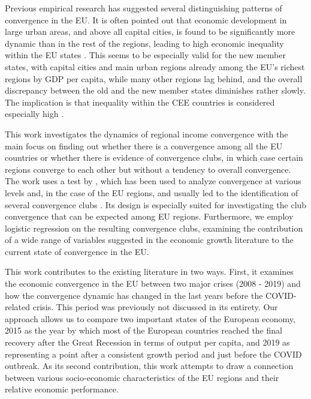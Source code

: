 \documentclass[11pt]{article}
\begin{document}
Previous empirical research has suggested several distinguishing patterns of convergence in the EU. It is often pointed out that economic development in large urban areas, and above all capital cities, is found to be significantly more dynamic than in the rest of the regions, leading to high economic inequality within the EU states \citep{geppert2008regional}. This seems to be especially valid for the new member states, with capital cities and main urban regions already among the EU's richest regions by GDP per capita, while many other regions lag behind, and the overall discrepancy between the old and the new member states diminishes rather slowly. The implication is that inequality within the CEE countries is considered especially high \citep{geppert2008regional,sme2012regional, smketkowski2013regional}.


This work investigates the dynamics of regional income convergence with the main focus on finding out whether there is a convergence among all the EU countries or whether there is evidence of convergence clubs, in which case certain regions converge to each other but without a tendency to overall convergence. The work uses a test by \citet{phillips2007transition}, which has been used to analyze convergence at various levels and, in the case of the EU regions, and usually led to the identification of several convergence clubs \citep{bartkowska2012regional, borsi2015evolution, von2017regional}. Its design is especially suited for investigating the club convergence that can be expected among EU regions. Furthermore, we employ logistic regression on the resulting convergence clubs, examining the contribution of a wide range of variables suggested in the economic growth literature to the current state of convergence in the EU.

This work contributes to the existing literature in two ways. First, it examines the economic convergence in the EU between two major crises (2008 - 2019) and how the convergence dynamic has changed in the last years before the COVID-related crisis. This period was previously not discussed in its entirety. Our approach allows us to compare two important states of the European economy, 2015 as the year by which most of the European countries reached the final recovery after the Great Recession in terms of output per capita, and 2019 as representing a point after a consistent growth period and just before the COVID outbreak. As its second contribution, this work attempts to draw a connection between various socio-economic characteristics of the EU regions and their relative economic performance.
\end{document}
